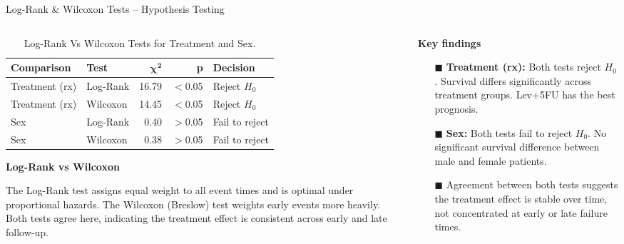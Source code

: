 \documentclass[aspectratio=169, 10pt]{beamer}
\begin{document}
\begin{frame}{Log-Rank \& Wilcoxon Tests -- Hypothesis Testing}

\begin{columns}[T]
  \begin{column}{0.54\textwidth}
    \begin{table}[ht]
    	\centering
    	\caption{Log-Rank Vs Wilcoxon Tests for Treatment and Sex.} %
    	\begin{center}
    		\small
    		\begin{tabular}{@{}llrrl@{}}
    			\toprule
    			\textbf{Comparison} & \textbf{Test} &
    			$\boldsymbol{\chi^2}$ & \textbf{p} &
    			\textbf{Decision} \\
    			\midrule
    			Treatment (rx) & Log-Rank  & 16.79 & $<$0.05 & Reject $H_0$ \\
    			Treatment (rx) & Wilcoxon  & 14.45 & $<$0.05 & Reject $H_0$ \\
    			Sex            & Log-Rank  &  0.40 & $>$0.05 & Fail to reject \\
    			Sex            & Wilcoxon  &  0.38 & $>$0.05 & Fail to reject \\
    			\bottomrule
    		\end{tabular}
    	\end{center}
    \end{table}
    
    

    \bigskip
    \textbf{Log-Rank vs Wilcoxon}

    \smallskip
    The Log-Rank test assigns equal weight to all event times
    and is optimal under proportional hazards. The Wilcoxon
    (Breslow) test weights early events more heavily.
    Both tests agree here, indicating the treatment effect
    is consistent across early and late follow-up.
  \end{column}

  \begin{column}{0.43\textwidth}
    \textbf{Key findings}
    \medskip
    \begin{itemize}
      \item [$\blacksquare$] \textbf{Treatment (rx):} Both tests reject $H_0$.
            Survival differs significantly across treatment
            groups. Lev+5FU has the best prognosis.
      \item [$\blacksquare$] \textbf{Sex:} Both tests fail to reject $H_0$.
            No significant survival difference between
            male and female patients.
      \item [$\blacksquare$] Agreement between both tests suggests the
            treatment effect is stable over time, not
            concentrated at early or late failure times.
    \end{itemize}
  \end{column}
\end{columns}

\end{frame}
\end{document}
